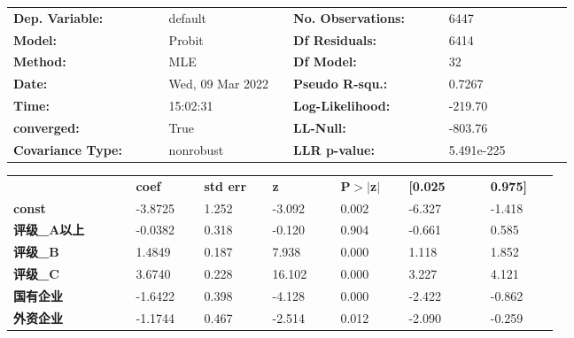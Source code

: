 \begin{center}
	\begin{tabular}{p{0.25\linewidth}p{0.2\linewidth}p{0.25\linewidth}p{0.2\linewidth}}
		\toprule
		\textbf{Dep. Variable:}   & default          & \textbf{  No. Observations:  } & 6447       \\
		\textbf{Model:}           & Probit           & \textbf{  Df Residuals:      } & 6414       \\
		\textbf{Method:}          & MLE              & \textbf{  Df Model:          } & 32         \\
		\textbf{Date:}            & Wed, 09 Mar 2022 & \textbf{  Pseudo R-squ.:     } & 0.7267     \\
		\textbf{Time:}            & 15:02:31         & \textbf{  Log-Likelihood:    } & -219.70    \\
		\textbf{converged:}       & True             & \textbf{  LL-Null:           } & -803.76    \\
		\textbf{Covariance Type:} & nonrobust        & \textbf{  LLR p-value:       } & 5.491e-225 \\
		\bottomrule
	\end{tabular}
	\begin{longtable}{p{0.18\linewidth}p{0.1\linewidth}p{0.1\linewidth}p{0.1\linewidth}p{0.1\linewidth}p{0.12\linewidth}p{0.1\linewidth}}
		\midrule
		                 & \textbf{coef} & \textbf{std err} & \textbf{z} & \textbf{P$> |$z$|$} & \textbf{[0.025} & \textbf{0.975]} \\
		\textbf{const}          & -3.8725       & 1.252            & -3.092     & 0.002               & -6.327          & -1.418          \\
		\textbf{评级\_A以上}    & -0.0382       & 0.318            & -0.120     & 0.904               & -0.661          & 0.585           \\
		\textbf{评级\_B}        & 1.4849        & 0.187            & 7.938      & 0.000               & 1.118           & 1.852           \\
		\textbf{评级\_C}        & 3.6740        & 0.228            & 16.102     & 0.000               & 3.227           & 4.121           \\
		\textbf{国有企业}       & -1.6422       & 0.398            & -4.128     & 0.000               & -2.422          & -0.862          \\
		\textbf{外资企业}       & -1.1744       & 0.467            & -2.514     & 0.012               & -2.090          & -0.259          \\

\end{longtable}
\end{center}
